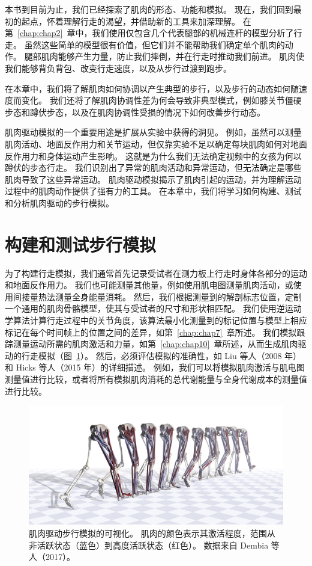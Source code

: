 本书到目前为止，我们已经探索了肌肉的形态、功能和模拟。
现在，我们回到最初的起点，怀着理解行走的渴望，并借助新的工具来加深理解。
在第~\ref{chap:chap2}~章中，我们使用仅包含几个代表腿部的机械连杆的模型分析了行走。
虽然这些简单的模型很有价值，但它们并不能帮助我们确定单个肌肉的动作。
腿部肌肉能够产生力量，防止我们摔倒，并在行走时推动我们前进。
肌肉使我们能够背负背包、改变行走速度，以及从步行过渡到跑步。


在本章中，我们将了解肌肉如何协调以产生典型的步行，以及步行的动态如何随速度而变化。
我们还将了解肌肉协调性差为何会导致非典型模式，例如膝关节僵硬步态和蹲伏步态，以及在肌肉协调性受损的情况下如何改善步行动态。


肌肉驱动模拟的一个重要用途是扩展从实验中获得的洞见。
例如，虽然可以测量肌肉活动、地面反作用力和关节运动，但仅靠实验不足以确定每块肌肉如何对地面反作用力和身体运动产生影响。
这就是为什么我们无法确定视频中的女孩为何以蹲伏的步态行走。
我们识别出了异常的肌肉活动和异常运动，但无法确定是哪些肌肉导致了这些异常运动。
肌肉驱动模拟揭示了肌肉引起的运动，并为理解运动过程中的肌肉动作提供了强有力的工具。
在本章中，我们将学习如何构建、测试和分析肌肉驱动的步行模拟。


\section{构建和测试步行模拟}

为了构建行走模拟，我们通常首先记录受试者在测力板上行走时身体各部分的运动和地面反作用力。
我们也可能测量其他量，例如使用肌电图测量肌肉活动，或使用间接量热法测量全身能量消耗。
然后，我们根据测量到的解剖标志位置，定制一个通用的肌肉骨骼模型，使其与受试者的尺寸和形状相匹配。
我们使用逆运动学算法计算行走过程中的关节角度，该算法最小化测量到的标记位置与模型上相应标记在每个时间帧上的位置之间的差异，如第~\ref{chap:chap7}~章所述。
我们模拟跟踪测量运动所需的肌肉激活和力量，如第~\ref{chap:chap10}~章所述，从而生成肌肉驱动的行走模拟（图~\ref{fig:11_1}）。
然后，必须评估模拟的准确性，如 Liu 等人（2008 年）和 Hicks 等人（2015 年）的详细描述。
例如，我们可以将模拟肌肉激活与肌电图测量值进行比较，或者将所有模拟肌肉消耗的总代谢能量与全身代谢成本的测量值进行比较。


\begin{figure}[!htb]
	\centering
	\includegraphics[width=1.0\linewidth]{chap11/11_1}
	\caption{肌肉驱动步行模拟的可视化。
		肌肉的颜色表示其激活程度，范围从非活跃状态（蓝色）到高度活跃状态（红色）。
		数据来自 Dembia 等人（2017）。 \label{fig:11_1}}
\end{figure}


